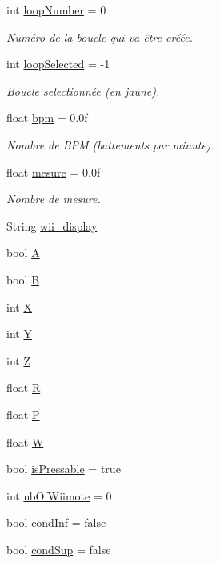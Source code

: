 \begin{DoxyCompactItemize}
int \hyperlink{class_music_a89ea80578a05f37ffefe4f83d6be0425}{loop\+Number} = 0
\begin{DoxyCompactList}\small\item\em Numéro de la boucle qui va être créée. \end{DoxyCompactList}\item 
int \hyperlink{class_music_a314e1e14f9b0f2fc88672df0a54ceda2}{loop\+Selected} = -\/1
\begin{DoxyCompactList}\small\item\em Boucle selectionnée (en jaune). \end{DoxyCompactList}\item 
float \hyperlink{class_music_a32f83f56e3522b34faf524ef322459e7}{bpm} = 0.\+0f
\begin{DoxyCompactList}\small\item\em Nombre de B\+P\+M (battements par minute). \end{DoxyCompactList}\item 
float \hyperlink{class_music_adf436d51d0b5be109beae967b4d34522}{mesure} = 0.\+0f
\begin{DoxyCompactList}\small\item\em Nombre de mesure. \end{DoxyCompactList}\item 
String \hyperlink{class_music_a937e074ddcaba7ed3666cf872c94d97f}{wii\+\_\+display}
\item 
bool \hyperlink{class_music_ab653d0747a20992b8f891361ff75c2fc}{A}
\item 
bool \hyperlink{class_music_a16991bd6f416f0fe945e89d7d480cad6}{B}
\item 
int \hyperlink{class_music_acb9bb6d52e75b11d305be2a2ae180cb5}{X}
\item 
int \hyperlink{class_music_af45a2d376fdee07df8fc263f17e940b5}{Y}
\item 
int \hyperlink{class_music_ac55cf30eb31695f3b6ec7ace7a8abb19}{Z}
\item 
float \hyperlink{class_music_a2008a64ad37c7a232a8c206d7acdbd0f}{R}
\item 
float \hyperlink{class_music_a8811033babcd7646e477060f69d578e6}{P}
\item 
float \hyperlink{class_music_acd36d67bfd91798211295d45ef911c34}{W}
\item 
bool \hyperlink{class_music_a6525acdf11a00376a98d5178ab822886}{is\+Pressable} = true
\item 
int \hyperlink{class_music_a4d9b6dba41b560393edf85a675e8a84f}{nb\+Of\+Wiimote} = 0
\item 
bool \hyperlink{class_music_a207d2cf72a65ec7a1e4ce02e3cfd29b9}{cond\+Inf} = false
\item 
bool \hyperlink{class_music_aeeb6f3c67f4b24bb83aaecf68075f51b}{cond\+Sup} = false
\end{DoxyCompactItemize}


